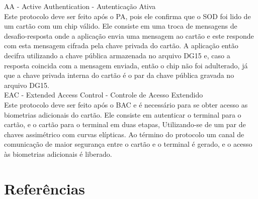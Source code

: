 \documentclass{article}
\begin{document}
\begin{justify}
			\hspace*{2cm} AA - Active Authentication - Autenticação Ativa\\
			\hspace*{2cm} Este protocolo deve ser feito após o PA, pois ele confirma que o SOD foi lido de um cartão com um chip válido. Ele consiste em uma troca de mensagens de desafio-resposta onde a aplicação envia uma mensagem ao cartão e este responde com esta mensagem cifrada pela chave privada do cartão. A aplicação então decifra utilizando a chave pública armazenada no arquivo DG15 e, caso a resposta coincida com a mensagem enviada, então o chip não foi adulterado, já que a chave privada interna do cartão é o par da chave pública gravada no arquivo DG15.\\
			
			\hspace*{2cm} EAC - Extended Access Control - Controle de Acesso Extendido\\
			\hspace*{2cm} Este protocolo deve ser feito após o BAC e é necessário para se obter acesso as biometrias adicionais do cartão. Ele consiste em autenticar o terminal para o cartão, e o cartão para o terminal em duas etapas, Utilizando-se de um par de chaves assimétrico com curvas elípticas. Ao término do protocolo um canal de comunicação de maior segurança entre o cartão e o terminal é gerado, e o acesso às biometrias adicionais é liberado.
			
		\end{justify}

	\section{}
		\begin{justify}
			
			
		\end{justify}

\begingroup
	\section{Referências}
		\renewcommand{\section}[2]{}
		
		
		
		
\endgroup
\end{document}
